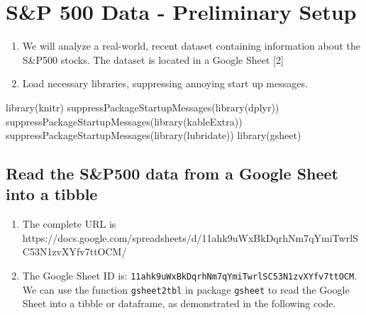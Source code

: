 \documentclass[
  letterpaper,
  DIV=11,
  numbers=noendperiod]{scrreport}
\newenvironment{Shaded}{\begin{snugshade}}{\end{snugshade}}
\newcommand{\FunctionTok}[1]{\textcolor[rgb]{0.28,0.35,0.67}{#1}}
\newcommand{\NormalTok}[1]{\textcolor[rgb]{0.00,0.23,0.31}{#1}}
\begin{document}
\hypertarget{sp-500-data---preliminary-setup}{%
\section{S\&P 500 Data - Preliminary
Setup}\label{sp-500-data---preliminary-setup}}

\begin{enumerate}
\def\labelenumi{\arabic{enumi}.}
\item
  We will analyze a real-world, recent dataset containing information
  about the S\&P500 stocks. The dataset is located in a Google Sheet
  {[}2{]}
\item
  Load necessary libraries, suppressing annoying start up messages.
\end{enumerate}

\begin{Shaded}
\begin{Highlighting}[]
\FunctionTok{library}\NormalTok{(knitr)}
\FunctionTok{suppressPackageStartupMessages}\NormalTok{(}\FunctionTok{library}\NormalTok{(dplyr))}
\FunctionTok{suppressPackageStartupMessages}\NormalTok{(}\FunctionTok{library}\NormalTok{(kableExtra))}
\FunctionTok{suppressPackageStartupMessages}\NormalTok{(}\FunctionTok{library}\NormalTok{(lubridate))}
\FunctionTok{library}\NormalTok{(gsheet)}
\end{Highlighting}
\end{Shaded}

\hypertarget{read-the-sp500-data-from-a-google-sheet-into-a-tibble}{%
\subsection{Read the S\&P500 data from a Google Sheet into a
tibble}\label{read-the-sp500-data-from-a-google-sheet-into-a-tibble}}

\begin{enumerate}
\def\labelenumi{\arabic{enumi}.}
\item
  The complete URL is\\
  https://docs.google.com/spreadsheets/d/11ahk9uWxBkDqrhNm7qYmiTwrlSC53N1zvXYfv7ttOCM/
\item
  The Google Sheet ID is:
  \texttt{11ahk9uWxBkDqrhNm7qYmiTwrlSC53N1zvXYfv7ttOCM}. We can use the
  function \texttt{gsheet2tbl} in package \texttt{gsheet} to read the
  Google Sheet into a tibble or dataframe, as demonstrated in the
  following code.
\end{enumerate}
\end{document}
